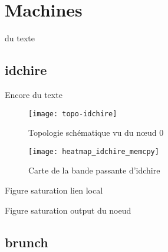 \section{Machines}\label{sec:contribs:machines}

du texte

\subsection{idchire}\label{sec:contribs:machines:idchire}
Encore du texte

\begin{figure}[ht]
  \centering
  \texttt{[image: topo-idchire]}
  \caption{Topologie schématique vu du nœud 0}\label{fig:contribs:machines:idchire:topo-liens}
\end{figure}

\begin{figure}[ht]
  \centering
  \texttt{[image: heatmap\_idchire\_memcpy]}
  \caption{Carte de la bande passante d'idchire}\label{fig:contribs:machines:idchire:heatmap}
\end{figure}

\begin{todo}
  Figure saturation lien local
\end{todo}

\begin{todo}
  Figure saturation output du noeud
\end{todo}

\subsection{brunch}\label{sec:contribs:machines:brunch}

